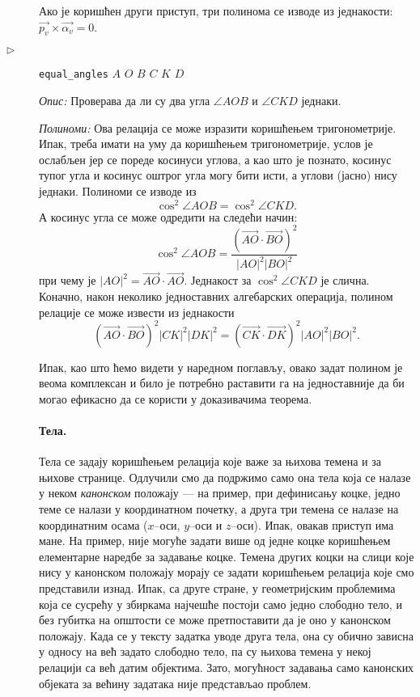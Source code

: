 \begin{description}
Ако је коришћен други приступ, три полинома се изводе из једнакости:
$\overrightarrow{p_v} \times \overrightarrow{\alpha_v} = 0$.

\item[$\triangleright$] {\tt equal\_angles} $A$ $O$ $B$ $C$ $K$ $D$

{\em Опис:} Проверава да ли су два угла $\angle AOB$ и $\angle
CKD$ једнаки.

{\em Полиноми:} Ова релација се може изразити коришћењем
тригонометрије. Ипак, треба имати на уму да коришћењем тригонометрије,
услов је ослабљен јер се пореде косинуси углова, а као што је познато,
косинус тупог угла и косинус оштрог угла могу бити исти, а углови
(јасно) нису једнаки. Полиноми се изводе из
$$\cos^2{\angle AOB} = \cos^2{\angle CKD}.$$
А косинус угла се може одредити на следећи начин:
$$\cos^2{\angle AOB} = \frac{(\overrightarrow{AO}\cdot
  \overrightarrow{BO})^2}{|AO|^2|BO|^2}$$ при чему је $|AO|^2 =
\overrightarrow{AO}\cdot \overrightarrow{AO}$.  Једнакост за
$\cos^2{\angle CKD}$ је слична. Коначно, након неколико једноставних
алгебарских операција, полином релације се може извести из једнакости
$$(\overrightarrow{AO}\cdot  \overrightarrow{BO})^2|CK|^2|DK|^2 = (\overrightarrow{CK}\cdot  \overrightarrow{DK})^2|AO|^2|BO|^2.$$

Ипак, као што ћемо видети у наредном поглављу, овако задат полином је
веома комплексан и било је потребно раставити га на једноставније да
би могао ефикасно да се користи у доказивачима теорема.


\paragraph{Тела.}
\label{solids_6glava}
Тела се задају коришћењем релација које важе за њихова темена и за
њихове странице. Одлучили смо да подржимо само она тела која се налазе
у неком \emph{канонском} положају --- на пример, при дефинисању коцке,
једно теме се налази у координатном почетку, а друга три темена се
налазе на координатним осама ($x$--оси, $y$--оси и $z$--оси). Ипак,
овакав приступ има мане. На пример, није могуће задати више од једне
коцке коришћењем елементарне наредбе за задавање коцке. Темена других
коцки на слици које нису у канонском положају морају се задати
коришћењем релација које смо представили изнад. Ипак, са друге стране,
у геометријским проблемима која се сусрећу у збиркама најчешће постоји
само једно слободно тело, и без губитка на општости се може
претпоставити да је оно у канонском положају. Када се у тексту задатка
уводе друга тела, она су обично зависна у односу на већ задато
слободно тело, па су њихова темена у некој релацији са већ датим
објектима. Зато, могућност задавања само канонских објеката за већину
задатака није представљао проблем.


\end{description}

